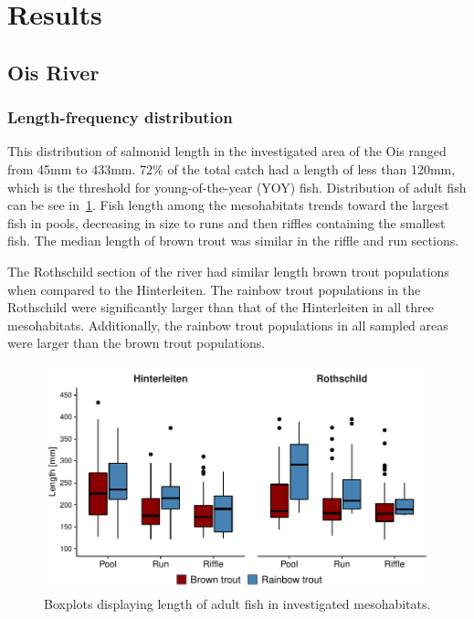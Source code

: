 \section{Results}

\subsection{Ois River}\label{sec:ois_river}       %




\subsubsection{Length-frequency distribution}\label{sec:ois_fish_lf}

This distribution of salmonid length in the investigated area of the Ois ranged from 45mm to 433mm. 72\% of the total catch had a length of less than 120mm, which is the threshold for young-of-the-year (YOY) fish. Distribution of adult fish can be see in~\cref{fig:avg_length}. Fish length among the mesohabitats trends toward the largest fish in pools, decreasing in size to runs and then riffles containing the smallest fish. The median length of brown trout was similar in the riffle and run sections.

The Rothschild section of the river had similar length brown trout populations when compared to the Hinterleiten. The rainbow trout populations in the Rothschild were significantly larger than that of the Hinterleiten in all three mesohabitats. Additionally, the rainbow trout populations in all sampled areas were larger than the brown trout populations.

\begin{figure}[!htb]                              %
	\center
	\includegraphics[width=.7\textwidth]{images/avg_length.pdf}                %
	\caption{Boxplots displaying length of adult fish in investigated mesohabitats.}      %
	\label{fig:avg_length}                                                       %
\end{figure}


